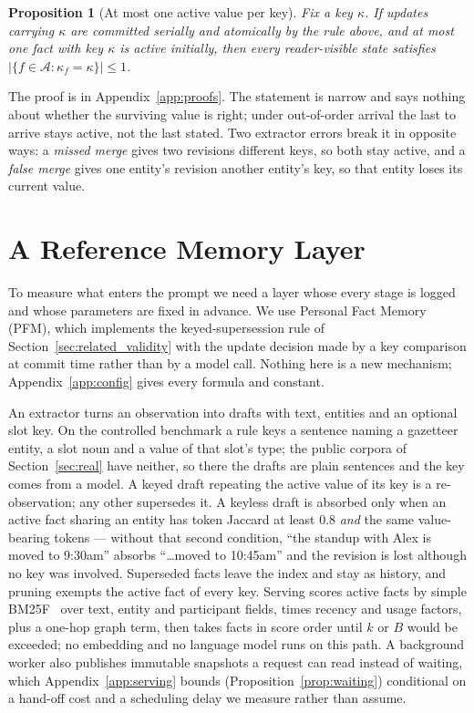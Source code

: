 \documentclass{article} %
\newtheorem{proposition}{Proposition}
\begin{document}
\begin{proposition}[At most one active value per key]
\label{prop:one_active}
Fix a key $\kappa$. If updates carrying $\kappa$ are committed serially and atomically by the rule above, and at most one fact with key $\kappa$ is active initially, then every reader-visible state satisfies $|\{f\in\mathcal{A}:\kappa_f=\kappa\}|\le 1$.
\end{proposition}

The proof is in Appendix~\ref{app:proofs}. The statement is narrow and says nothing about whether the surviving value is right; under out-of-order arrival the last to arrive stays active, not the last stated. Two extractor errors break it in opposite ways: a \emph{missed merge} gives two revisions different keys, so both stay active, and a \emph{false merge} gives one entity's revision another entity's key, so that entity loses its current value.

\section{A Reference Memory Layer}
\label{sec:pfm}

To measure what enters the prompt we need a layer whose every stage is logged and whose parameters are fixed in advance. We use Personal Fact Memory (PFM), which implements the keyed-supersession rule of Section~\ref{sec:related_validity} with the update decision made by a key comparison at commit time rather than by a model call. Nothing here is a new mechanism; Appendix~\ref{app:config} gives every formula and constant.

An extractor turns an observation into drafts with text, entities and an optional slot key. On the controlled benchmark a rule keys a sentence naming a gazetteer entity, a slot noun and a value of that slot's type; the public corpora of Section~\ref{sec:real} have neither, so there the drafts are plain sentences and the key comes from a model. A keyed draft repeating the active value of its key is a re-observation; any other supersedes it. A keyless draft is absorbed only when an active fact sharing an entity has token Jaccard at least $0.8$ \emph{and} the same value-bearing tokens --- without that second condition, ``the standup with Alex is moved to 9:30am'' absorbs ``\ldots moved to 10:45am'' and the revision is lost although no key was involved. Superseded facts leave the index and stay as history, and pruning exempts the active fact of every key. Serving scores active facts by simple BM25F~\citep{robertson2004simple,robertson2009probabilistic} over text, entity and participant fields, times recency and usage factors, plus a one-hop graph term, then takes facts in score order until $k$ or $B$ would be exceeded; no embedding and no language model runs on this path. A background worker also publishes immutable snapshots a request can read instead of waiting, which Appendix~\ref{app:serving} bounds (Proposition~\ref{prop:waiting}) conditional on a hand-off cost and a scheduling delay we measure rather than assume.
\end{document}

